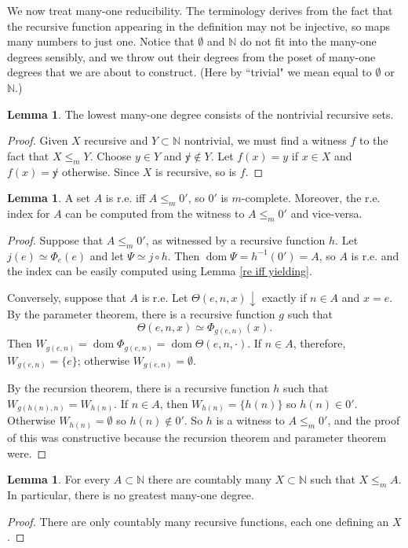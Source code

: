 \documentclass[12pt]{report}
\newcommand{\NN}{\mathbb{N}}
\newcommand{\halts}{\downarrow}
\DeclareMathOperator{\dom}{dom}
\theoremstyle{definition}
\newtheorem{lemma}[theorem]{Lemma}
\begin{document}
We now treat many-one reducibility. The terminology derives from the fact that the recursive function appearing in the definition may not be injective, so maps many numbers to just one. Notice that $\emptyset$ and $\NN$ do not fit into the many-one degrees sensibly, and we throw out their degrees from the poset of many-one degrees that we are about to construct. (Here by ``trivial" we mean equal to $\emptyset$ or $\NN$.)
\begin{lemma}
The lowest many-one degree consists of the nontrivial recursive sets.
\end{lemma}
\begin{proof}
Given $X$ recursive and $Y \subset \NN$ nontrivial, we must find a witness $f$ to the fact that $X \leq_m Y$. Choose $y \in Y$ and $\not y \notin Y$. Let $f(x) = y$ if $x \in X$ and $f(x) = \not y$ otherwise. Since $X$ is recursive, so is $f$.
\end{proof}
\begin{lemma}
  \label{0jump is many1 complete}
A set $A$ is r.e. iff $A \leq_m 0'$, so $0'$ is $m$-complete. Moreover, the r.e. index for $A$ can be computed from the witness to $A \leq_m 0'$ and vice-versa.
\end{lemma}
\begin{proof}
Suppose that $A \leq_m 0'$, as witnessed by a recursive function $h$. Let $j(e) \simeq \Phi_e(e)$ and let $\Psi \simeq j \circ h$. Then $\dom \Psi = h^{-1}(0') = A$, so $A$ is r.e. and the index can be easily computed using Lemma \ref{re iff yielding}.

Conversely, suppose that $A$ is r.e. Let $\Theta(e, n, x) \halts$ exactly if $n \in A$ and $x = e$. By the parameter theorem, there is a recursive function $g$ such that
$$\Theta(e, n, x) \simeq \Phi_{g(e, n)}(x).$$
Then $W_{g(e, n)} = \dom \Phi_{g(e, n)} = \dom \Theta(e, n, \cdot)$. If $n \in A$, therefore, $W_{g(e, n)} = \{e\}$; otherwise $W_{g(e, n)} = \emptyset$.

By the recursion theorem, there is a recursive function $h$ such that $W_{g(h(n), n)} = W_{h(n)}$. If $n \in A$, then $W_{h(n)} = \{h(n)\}$ so $h(n) \in 0'$. Otherwise $W_{h(n)} = \emptyset$ so $h(n) \notin 0'$. So $h$ is a witness to $A \leq_m 0'$, and the proof of this was constructive because the recursion theorem and parameter theorem were.
\end{proof}

\begin{lemma}
For every $A \subset \NN$ there are countably many $X \subset \NN$ such that $X \leq_m A$. In particular, there is no greatest many-one degree.
\end{lemma}
\begin{proof}
There are only countably many recursive functions, each one defining an $X$.
\end{proof}
\end{document}
